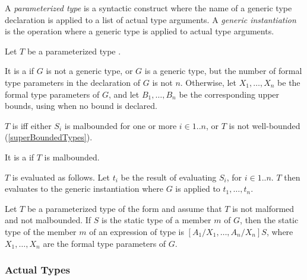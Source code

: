\documentclass[makeidx]{article}
\begin{document}
\LMHash{}%
A \emph{parameterized type} is a syntactic construct
where the name of a generic type declaration is applied to
a list of actual type arguments.
A \emph{generic instantiation} is the operation where
a generic type is applied to actual type arguments.


\LMHash{}%
Let $T$ be a parameterized type .

\LMHash{}%
It is a  if $G$ is not a generic type,
or $G$ is a generic type,
but the number of formal type parameters in the declaration of $G$ is not $n$.
Otherwise, let
$X_1, \ldots, X_n$
be the formal type parameters of $G$, and let
$B_1, \ldots, B_n$
be the corresponding upper bounds, using \DYNAMIC{} when no bound is declared.

\LMHash{}%
$T$ is  if{}f either
$S_i$ is malbounded for one or more $i \in 1 .. n$,
or $T$ is not well-bounded (\ref{superBoundedTypes}).

\LMHash{}%
It is a  if $T$ is malbounded.

\LMHash{}%
$T$ is evaluated as follows.
Let $t_i$ be the result of evaluating $S_i$, for $i \in 1 .. n$.
$T$ then evaluates to the generic instantiation
where $G$ is applied to $t_1, \ldots, t_n$.

\LMHash{}%
Let $T$ be a parameterized type of the form
and assume that $T$ is not malformed and not malbounded.
If $S$ is the static type of a member $m$ of $G$,
then the static type of the member $m$ of an expression of type
is
$[A_1/X_1, \ldots, A_n/X_n]S$,
where $X_1, \ldots, X_n$ are the formal type parameters of $G$.



\subsubsection{Actual Types}
\end{document}

